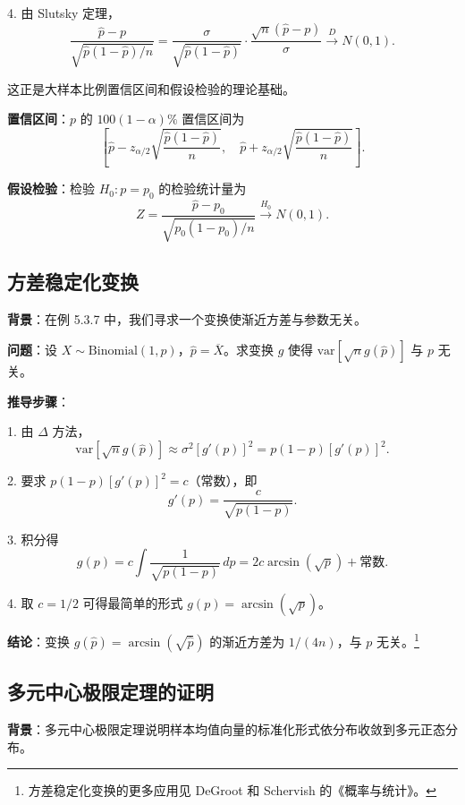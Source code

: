 4. 由 Slutsky 定理，
\[
\frac{\widehat{p} - p}{\sqrt{\widehat{p}(1-\widehat{p})/n}} = \frac{\sigma}{\sqrt{\widehat{p}(1-\widehat{p})}} \cdot \frac{\sqrt{n}(\widehat{p} - p)}{\sigma} \xrightarrow{D} N(0,1).
\label{eq:proportion-slutsky}
\]

这正是大样本比例置信区间和假设检验的理论基础。

\textbf{置信区间}：$p$ 的 $100(1-\alpha)\%$ 置信区间为
\[
\left[\widehat{p} - z_{\alpha/2}\sqrt{\frac{\widehat{p}(1-\widehat{p})}{n}},\quad \widehat{p} + z_{\alpha/2}\sqrt{\frac{\widehat{p}(1-\widehat{p})}{n}}\right].
\label{eq:proportion-ci}
\]

\textbf{假设检验}：检验 $H_0: p = p_0$ 的检验统计量为
\[
Z = \frac{\widehat{p} - p_0}{\sqrt{p_0(1-p_0)/n}} \xrightarrow{H_0} N(0,1).
\label{eq:proportion-test}
\]

\subsection{方差稳定化变换}\label{sec:variance-stabilizing}

\textbf{背景}：在例 5.3.7 中，我们寻求一个变换使渐近方差与参数无关。

\textbf{问题}：设 $X \sim \mathrm{Binomial}(1, p)$，$\widehat{p} = \overline{X}$。求变换 $g$ 使得 $\text{var}[\sqrt{n}g(\widehat{p})]$ 与 $p$ 无关。

\textbf{推导步骤}：

1. 由 $\Delta$ 方法，
\[
\text{var}[\sqrt{n}g(\widehat{p})] \approx \sigma^2 [g'(p)]^2 = p(1-p)[g'(p)]^2.
\label{eq:variance-stabilization-1}
\]

2. 要求 $p(1-p)[g'(p)]^2 = c$（常数），即
\[
g'(p) = \frac{c}{\sqrt{p(1-p)}}.
\label{eq:variance-stabilization-2}
\]

3. 积分得
\[
g(p) = c \int \frac{1}{\sqrt{p(1-p)}}\,dp = 2c \arcsin(\sqrt{p}) + \text{常数}.
\label{eq:variance-stabilization-3}
\]

4. 取 $c = 1/2$ 可得最简单的形式 $g(p) = \arcsin(\sqrt{p})$。

\textbf{结论}：变换 $g(\widehat{p}) = \arcsin(\sqrt{\widehat{p}})$ 的渐近方差为 $1/(4n)$，与 $p$ 无关。\footnote{方差稳定化变换的更多应用见 DeGroot 和 Schervish 的《概率与统计》。}

\subsection{多元中心极限定理的证明}\label{sec:multivariate-clt-proof}

\textbf{背景}：多元中心极限定理说明样本均值向量的标准化形式依分布收敛到多元正态分布。

